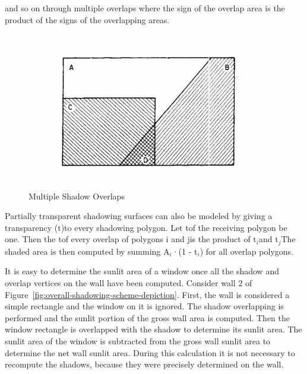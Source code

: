 and so on through multiple overlaps where the sign of the overlap area is the product of the signs of the overlapping areas.

\begin{figure}[hbtp] %
\centering
\includegraphics[width=0.9\textwidth, height=0.9\textheight, keepaspectratio=true]{media/image642.png}
\caption{  Multiple Shadow Overlaps \protect \label{fig:multiple-shadow-overlaps}}
\end{figure}

Partially transparent shadowing surfaces can also be modeled by giving a transparency (t)to every shadowing polygon. Let tof the receiving polygon be one. Then the tof every overlap of polygons i and jis the product of t\(_{i}\)and t\(_{j}\)The shaded area is then computed by summing A\(_{i}\)·(1 - t\(_{i}\)) for all overlap polygons.

It is easy to determine the sunlit area of a window once all the shadow and overlap vertices on the wall have been computed. Consider wall 2 of Figure~\ref{fig:overall-shadowing-scheme-depiction}. First, the wall is considered a simple rectangle and the window on it is ignored. The shadow overlapping is performed and the sunlit portion of the gross wall area is computed. Then the window rectangle is overlapped with the shadow to determine its sunlit area. The sunlit area of the window is subtracted from the gross wall sunlit area to determine the net wall sunlit area. During this calculation it is not necessary to recompute the shadows, because they were precisely determined on the wall.

